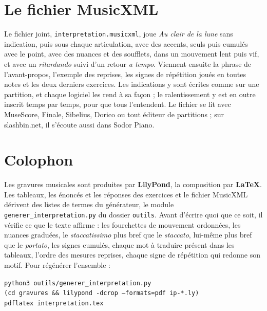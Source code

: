 \documentclass[a4paper,11pt]{article}
\begin{document}
\section{Le fichier MusicXML}
\label{sec:musicxml}

Le fichier joint, \texttt{interpretation.musicxml}, joue \emph{Au clair de la
lune} sans indication, puis sous chaque articulation, avec des accents, seuls
puis cumulés avec le point, avec des nuances et des soufflets, dans un mouvement
lent puis vif, et avec un \emph{ritardando} suivi d'un retour \emph{a tempo}.
Viennent ensuite la phrase de l'avant-propos, l'exemple des reprises, les signes
de répétition joués en toutes notes et les deux derniers exercices. Les
indications y sont écrites comme sur une partition, et chaque logiciel les rend
à sa façon ; le ralentissement y est en outre inscrit temps par temps, pour que
tous l'entendent. Le fichier se lit avec MuseScore, Finale, Sibelius, Dorico ou
tout éditeur de partitions ; sur slashbin.net, il s'écoute aussi dans Sodor
Piano.

\section*{Colophon}

Les gravures musicales sont produites par \textbf{LilyPond}, la composition
par \textbf{\LaTeX}. Les tableaux, les énoncés et les réponses des exercices et
le fichier MusicXML dérivent des listes de termes du générateur, le module
\texttt{generer\_interpretation.py} du dossier \texttt{outils}. Avant d'écrire
quoi que ce soit, il vérifie ce que le texte affirme : les fourchettes de
mouvement ordonnées, les nuances graduées, le \emph{staccatissimo} plus bref que
le \emph{staccato}, lui-même plus bref que le \emph{portato}, les signes
cumulés, chaque mot à traduire présent dans les tableaux, l'ordre des mesures
reprises, chaque signe de répétition qui redonne son motif. Pour
régénérer l'ensemble :

\begin{center}
\texttt{python3 outils/generer\_interpretation.py}\\
\texttt{(cd gravures \&\& lilypond -dcrop --formats=pdf ip-*.ly)}\\
\texttt{pdflatex interpretation.tex}
\end{center}
\end{document}
